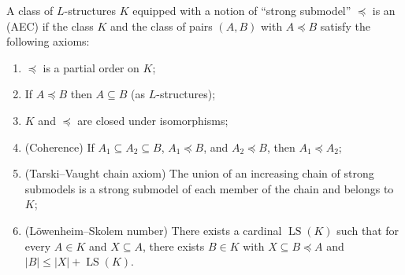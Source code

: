 A class of $L$-structures $K$ equipped with a notion of ``strong submodel'' $\preceq$ is an  (AEC) if the class $K$ and the class of pairs $(A, B)$ with $A \preceq B$ satisfy the following axioms:
\begin{enumerate}
\item[(a)] $\preceq$ is a partial order on $K$;
\item[(b)] If $A \preceq B$ then $A \subseteq B$ (as $L$-structures);
\item[(c)] $K$ and $\preceq$ are closed under isomorphisms;
\item[(d)] (Coherence) If $A_1 \subseteq A_2 \subseteq B$, $A_1 \preceq B$, and $A_2 \preceq B$, then $A_1 \preceq A_2$;
\item[(e)] (Tarski--Vaught chain axiom) The union of an increasing chain of strong submodels is a strong submodel of each member of the chain and belongs to $K$;
\item[(f)] (Löwenheim--Skolem number) There exists a cardinal $\operatorname{LS}(K)$ such that for every $A \in K$ and $X \subseteq A$, there exists $B \in K$ with $X \subseteq B \preceq A$ and $|B| \leq |X| + \operatorname{LS}(K)$.
\end{enumerate}
